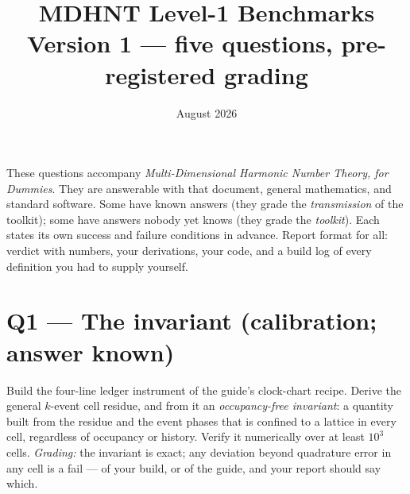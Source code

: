 \documentclass[11pt]{article}
\title{MDHNT Level-1 Benchmarks\\ \large Version 1 --- five questions, pre-registered grading}
\author{}
\date{August 2026}
\begin{document}
\maketitle

\noindent These questions accompany \emph{Multi-Dimensional Harmonic Number
Theory, for Dummies}.  They are answerable with that document, general
mathematics, and standard software.  Some have known answers (they grade the
\emph{transmission} of the toolkit); some have answers nobody yet knows (they
grade the \emph{toolkit}).  Each states its own success and failure conditions
in advance.  Report format for all: verdict with numbers, your derivations,
your code, and a build log of every definition you had to supply yourself.

\section*{Q1 --- The invariant (calibration; answer known)}
Build the four-line ledger instrument of the guide's clock-chart recipe.  Derive
the general $k$-event cell residue, and from it an \emph{occupancy-free
invariant}: a quantity built from the residue and the event phases that is
confined to a lattice in every cell, regardless of occupancy or history.
Verify it numerically over at least $10^3$ cells.
\emph{Grading:} the invariant is exact; any deviation beyond quadrature error in
any cell is a fail --- of your build, or of the guide, and your report should
say which.
\end{document}
